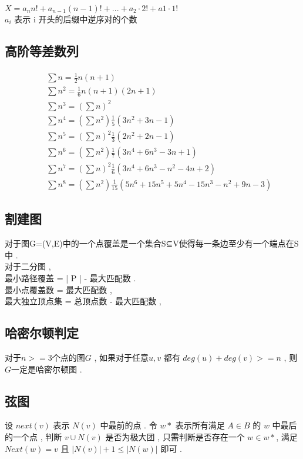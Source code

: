\paragraph{}
$ X = a_n  n! + a_{n-1}  (n - 1)! + ... + a_2 \cdot 2! + a1 \cdot 1! $ \\
$ a_i $ 表示 i 开头的后缀中逆序对的个数
\subsection{高阶等差数列}
    \paragraph{}
    \begin{eqnarray}
        && \sum n = \frac{1}{2}n(n+1)\\
        && \sum n^2 = \frac{1}{6}n(n+1)(2n+1) \\
        && \sum n^3 = \left(\sum n\right)^2 \\
        && \sum n^4 = \left(\sum n^2\right)\frac{1}{5}(3n^2+3n-1)\\
        && \sum n^5 = \left(\sum n\right)^2\frac{1}{3}(2n^2+2n-1)\\
        && \sum n^6 = \left(\sum n^2\right)\frac{1}{7}(3n^4+6n^3-3n+1)\\
        && \sum n^7 = \left(\sum n\right)^2\frac{1}{6}(3n^4+6n^3-n^2-4n+2)\\
        && \sum n^8 = \left(\sum n^2\right)\frac{1}{15}(5n^6+15n^5+5n^4-15n^3-n^2+9n-3)
    \end{eqnarray}

\subsection{割建图}
对于图G=(V,E)中的一个点覆盖是一个集合S⊆V使得每一条边至少有一个端点在S中 . \\
        对于二分图 , \\
        最小路径覆盖 = | P | - 最大匹配数 . \\
        最小点覆盖数 = 最大匹配数 , \\
        最大独立顶点集 = 总顶点数 - 最大匹配数 , \\
\subsection{哈密尔顿判定}
对于$ n >= 3 $个点的图$ G $ , 如果对于任意$ u, v $ 都有  $ deg(u) + deg(v) >= n $ , 则$ G $一定是哈密尔顿图 .
\subsection{弦图}
设 $next(v)$ 表示 $N(v)$ 中最前的点 . 
令 $w*$ 表示所有满足 $A \in B$ 的 $w$ 中最后的一个点 , 
判断 $v \cup N(v)$ 是否为极大团 , 
只需判断是否存在一个 $w \in w*$, 
满足 $Next(w)=v$ 且 $|N(v)| + 1 \leq |N(w)|$ 即可 . 
